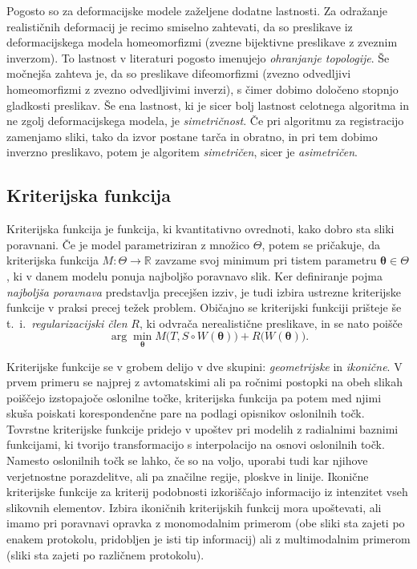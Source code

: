 \documentclass[journal]{IEEEtran}
\begin{document}
Pogosto so za deformacijske modele zaželjene dodatne lastnosti. Za odražanje realističnih deformacij je recimo smiselno zahtevati, da so preslikave iz deformacijskega modela homeomorfizmi (zvezne bijektivne preslikave z zveznim inverzom). To lastnost v literaturi pogosto imenujejo \emph{ohranjanje topologije}. Še močnejša zahteva je, da so preslikave difeomorfizmi (zvezno odvedljivi homeomorfizmi z zvezno odvedljivimi inverzi), s čimer dobimo določeno stopnjo gladkosti preslikav. Še ena lastnost, ki je sicer bolj lastnost celotnega algoritma in ne zgolj deformacijskega modela, je \emph{simetričnost}. Če pri algoritmu za registracijo zamenjamo sliki, tako da izvor postane tarča in obratno, in pri tem dobimo inverzno preslikavo, potem je algoritem \emph{simetričen}, sicer je \emph{asimetričen}.

\subsection{Kriterijska funkcija}

Kriterijska funkcija je funkcija, ki kvantitativno ovrednoti, kako dobro sta sliki poravnani. Če je model parametriziran z množico $\Theta$, potem se pričakuje, da kriterijska funkcija $M\colon\Theta\to\mathbb{R}$ zavzame svoj minimum pri tistem parametru $\boldsymbol{\theta}\in\Theta$, ki v danem modelu ponuja najboljšo poravnavo slik. Ker definiranje pojma \textit{najboljša poravnava} predstavlja precejšen izziv, je tudi izbira ustrezne kriterijske funkcije v praksi precej težek problem. Običajno se kriterijski funkciji prišteje še t.~i.~\emph{regularizacijski člen} $R$, ki odvrača nerealistične preslikave, in se nato poišče
\begin{equation}
 \arg\min_{\boldsymbol{\theta}}M\big(T,S\circ W(\boldsymbol{\theta})\big)+R\big(W(\boldsymbol{\theta})\big).
\end{equation}


Kriterijske funkcije se v grobem delijo v dve skupini: \emph{geometrijske} in \emph{ikonične}. V prvem primeru se najprej z avtomatskimi ali pa ročnimi postopki na obeh slikah poiščejo izstopajoče oslonilne točke, kriterijska funkcija pa potem med njimi skuša poiskati korespondenčne pare na podlagi opisnikov oslonilnih točk. Tovrstne kriterijske funkcije pridejo v upoštev pri modelih z radialnimi baznimi funkcijami, ki tvorijo transformacijo s interpolacijo na osnovi oslonilnih točk. Namesto oslonilnih točk se lahko, če so na voljo, uporabi tudi kar njihove verjetnostne porazdelitve, ali pa značilne regije, ploskve in linije. Ikonične kriterijske funkcije za kriterij podobnosti izkoriščajo informacijo iz intenzitet vseh slikovnih elementov. Izbira ikoničnih kriterijskih funkcij mora upoštevati, ali imamo pri poravnavi opravka z monomodalnim primerom (obe sliki sta zajeti po enakem protokolu, pridobljen je isti tip informacij) ali z multimodalnim primerom (sliki sta zajeti po različnem protokolu).
\end{document}
